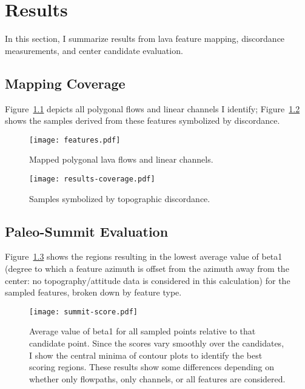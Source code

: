 \chapter{Results}\label{cha:results}

In this section, I summarize results from lava feature mapping, discordance measurements, and center candidate evaluation. 

\section{Mapping Coverage}

Figure~\ref{fig:features} depicts all polygonal flows and linear channels I identify; Figure~\ref{fig:results-coverage} shows the samples derived from these features symbolized by discordance.

\begin{figure}
    \texttt{[image: features.pdf]}%
    \caption[Mapped lava features]{Mapped polygonal lava flows and linear channels.}%
    \label{fig:features}
\end{figure}

\begin{figure}
    \texttt{[image: results-coverage.pdf]}%
    \caption[Mapped topographic discordance]{Samples symbolized by topographic discordance.}%
    \label{fig:results-coverage}
\end{figure}

\section{Paleo-Summit Evaluation}

Figure~\ref{fig:summit-score} shows the regions resulting in the lowest average value of \acs{beta1} (degree to which a feature azimuth is offset from the azimuth away from the center: no topography/attitude data is considered in this calculation) for the sampled features, broken down by feature type.

\begin{figure}
    \texttt{[image: summit-score.pdf]}%
    \caption[Paleo-summit evaluation]{Average value of \acs{beta1} for all sampled points relative to that candidate point. Since the scores vary smoothly over the candidates, I show the central minima of contour plots to identify the best scoring regions. These results show some differences depending on whether only flowpaths, only channels, or all features are considered.}%
    \label{fig:summit-score}
\end{figure}


